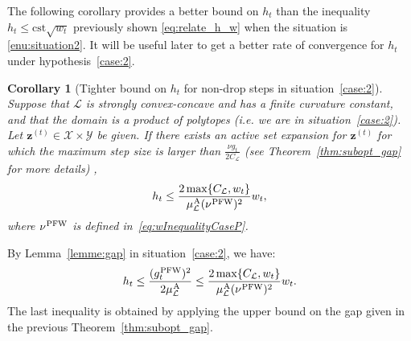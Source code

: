 \documentclass[twoside]{article}
\renewcommand{\L}{\mathcal{L}}
\newcommand{\X}{\mathcal{X}}
\newcommand{\Y}{\mathcal{Y}}
\newcommand{\M}{\X \times \Y}
\newcommand{\zt}{\bm{z}^{(t)}}
\newcommand{\gap}{g_{t}}
\newcommand{\CondNumb}{\nu}
\newtheorem{corollary}[definition]{Corollary}
\newcommand{\PW}{{\hspace{0.05em}\textnormal{PFW}}}
\newcommand{\away}{{\hspace{0.05em}\textnormal{A}}}
\newcommand{\0}{\mathbf{0}} %
\begin{document}
  The following corollary provides a better bound on $h_t$ than the inequality $h_t \leq \textrm{cst} \sqrt{w_t}$ previously shown \eqref{eq:relate_h_w} when the situation is \eqref{enu:situation2}. It will be useful later to get a better rate of convergence for $h_t$ under hypothesis~\eqref{case:2}. 
  \begin{corollary}[Tighter bound on $h_t$ for non-drop steps in situation~\eqref{case:2}]
  \label{cor:h_w}
  Suppose that $\L$ is strongly convex-concave and has a finite curvature constant, and that the domain is a product of polytopes (i.e. we are in situation~\eqref{case:2}). Let $\zt \in \M$  be given. If there exists an active set expansion for $\zt$ for which the maximum step size is larger than $\frac{\CondNumb\gap}{2C_\L}$ (see Theorem~\eqref{thm:subopt_gap} for more details) ,
    \begin{equation}
            h_t \leq \frac{2 \max \{C_\L,w_t\}}{\mu^{\away}_\L (\CondNumb^\PW)^2} w_t ,
    \end{equation}
    where $\CondNumb^\PW$ is defined in~\eqref{eq:wInequalityCaseP}.
  \end{corollary}
  \proof
  By Lemma~\ref{lemme:gap} in situation~\eqref{case:2}, we have:
  \begin{equation*}
  h_t \leq \frac{(\gap^{\PW})^2}{2 \mu^{\away}_\L} \leq \frac{2\max \{C_\L,w_t\}}{\mu^{\away}_\L (\CondNumb^\PW)^2} w_t.
  \end{equation*}
  The last inequality is obtained by applying the upper bound on the gap given in the previous Theorem~\ref{thm:subopt_gap}.
  \endproof

%
\end{document}
